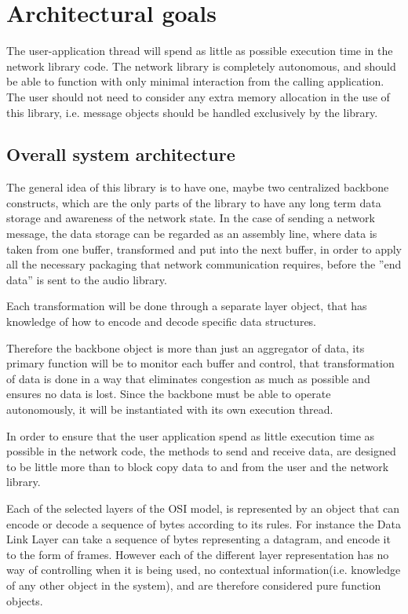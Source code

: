 \section{Architectural goals}
The user-application thread will spend as little as possible execution time in the network library code.
The network library is completely autonomous, and should be able to function with only minimal interaction from the calling application.
The user should not need to consider any extra memory allocation in the use of this library, i.e. message objects should be handled exclusively by the library.

\subsection{Overall system architecture}
The general idea of this library is to have one, maybe two centralized backbone constructs, which are the only parts of the library to have any long term data storage and awareness of the network state. In the case of sending a network message, the data storage can be regarded as an assembly line, where data is taken from one buffer, transformed and put into the next buffer, in order to apply all the necessary packaging that network communication requires, before the ''end data'' is sent to the audio library.

Each transformation will be done through a separate layer object, that has knowledge of how to encode and decode specific data structures.

Therefore the backbone object is more than just an aggregator of data, its primary function will be to monitor each buffer and control, that transformation of data is done in a way that eliminates congestion as much as possible and ensures no data is lost. Since the backbone must be able to operate autonomously, it will be instantiated with its own execution thread.

In order to ensure that the user application spend as little execution time as possible in the network code, the methods to send and receive data, are designed to be little more than to block copy data to and from the user and the network library.

Each of the selected layers of the OSI model, is represented by an object that can encode or decode a sequence of bytes according to its rules. For instance the Data Link Layer can take a sequence of bytes representing a datagram, and encode it to the form of frames.
However each of the different layer representation has no way of controlling when it is being used, no contextual information(i.e. knowledge of any other object in the system), and are therefore considered pure function objects.

